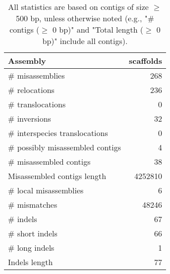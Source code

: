 \documentclass[12pt,a4paper]{article}
\begin{document}
\begin{table}[ht]
\begin{center}
\caption{All statistics are based on contigs of size $\geq$ 500 bp, unless otherwise noted (e.g., "\# contigs ($\geq$ 0 bp)" and "Total length ($\geq$ 0 bp)" include all contigs).}
\begin{tabular}{|l*{1}{|r}|}
\hline
Assembly & scaffolds \\ \hline
\# misassemblies & 268 \\ \hline
\hspace{5mm}\# relocations & 236 \\ \hline
\hspace{5mm}\# translocations & 0 \\ \hline
\hspace{5mm}\# inversions & 32 \\ \hline
\hspace{5mm}\# interspecies translocations & 0 \\ \hline
\# possibly misassembled contigs & 4 \\ \hline
\# misassembled contigs & 38 \\ \hline
Misassembled contigs length & 4252810 \\ \hline
\# local misassemblies & 6 \\ \hline
\# mismatches & 48246 \\ \hline
\# indels & 67 \\ \hline
\hspace{5mm}\# short indels & 66 \\ \hline
\hspace{5mm}\# long indels & 1 \\ \hline
Indels length & 77 \\ \hline
\end{tabular}
\end{center}
\end{table}
\end{document}
